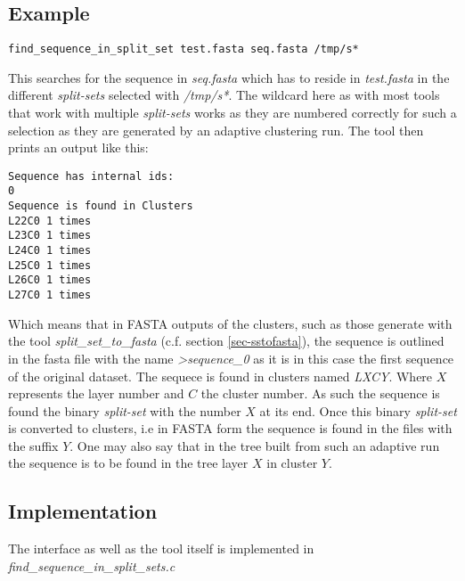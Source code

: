 \subsection{Example}
\begin{lstlisting}
find_sequence_in_split_set test.fasta seq.fasta /tmp/s*
\end{lstlisting}
This searches for the sequence in \emph{seq.fasta} which has to reside
in \emph{test.fasta} in the different \emph{split-sets} selected with
\emph{/tmp/s*}. The wildcard here as with most tools that work with
multiple \emph{split-sets} works as they are numbered correctly for
such a selection as they are generated by an adaptive clustering run.
The tool then prints an output like this:
\begin{lstlisting}
Sequence has internal ids: 
0 
Sequence is found in Clusters
L22C0 1 times
L23C0 1 times
L24C0 1 times
L25C0 1 times
L26C0 1 times
L27C0 1 times
\end{lstlisting}
Which means that in FASTA outputs of the clusters, such as those
generate with the tool \emph{split\_set\_to\_fasta} (c.f. section
\ref{sec-sstofasta}), the sequence is
outlined in the fasta file with the name \emph{>sequence\_0} as it is
in this case the first sequence of the original dataset. The sequece
is found in clusters named \emph{LXCY}. Where $X$ represents the layer
number and $C$ the cluster number. As such the sequence is found the
binary \emph{split-set} with the number $X$ at its end. Once this
binary \emph{split-set} is converted to clusters, i.e in FASTA form
the sequence is found in the files with the suffix $Y$. One may also
say that in the tree built from such an adaptive run the sequence is
to be found in the tree layer $X$ in cluster $Y$.

\subsection{Implementation}
The interface as well as the tool itself is implemented in
\emph{find\_sequence\_in\_split\_sets.c}
